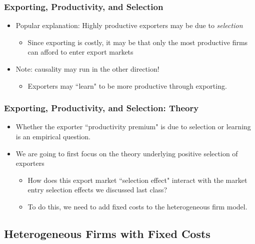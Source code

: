 \documentclass{beamer}
\begin{document}
\begin{frame}
	\frametitle{Exporting, Productivity, and Selection}
	
\begin{itemize}
	\item Popular explanation: Highly productive exporters may be due to \emph{selection}
		\begin{itemize}
			\item Since exporting is costly, it may be that only the most productive firms can afford to enter export markets
		\end{itemize}
	\item Note: causality may run in the other direction!
		\begin{itemize}
			\item Exporters may ``learn" to be more productive through exporting.
		\end{itemize}
\end{itemize}

\end{frame}

\begin{frame}
	\frametitle{Exporting, Productivity, and Selection: Theory}
	\begin{itemize}
	\item Whether the exporter ``productivity premium" is due to selection or learning is an empirical question.
	\item We are going to first focus on the theory underlying positive selection of exporters
	\begin{itemize}
		\item How does this export market ``selection effect" interact with the market entry selection effects we discussed last class?
		\item To do this, we need to add fixed costs to the heterogeneous firm model.
	\end{itemize}
\end{itemize}
	
\end{frame}
\subsection{Heterogeneous Firms with Fixed Costs}
\end{document}
